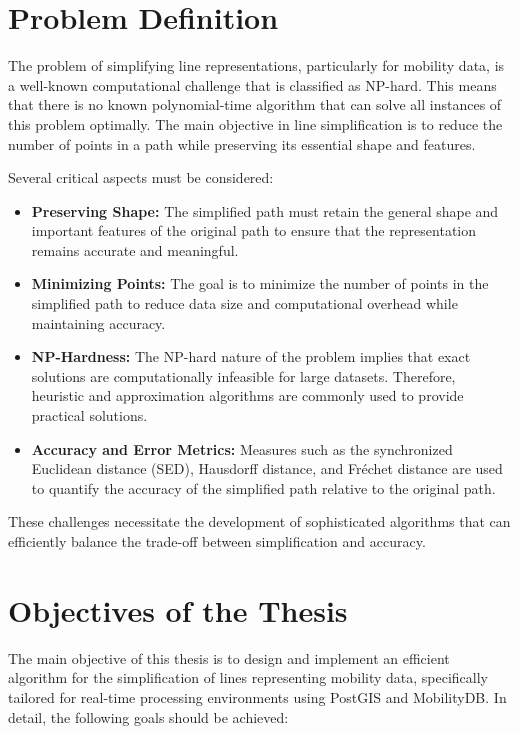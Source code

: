 \section{Problem Definition}

The problem of simplifying line representations, particularly for mobility data, is a well-known computational challenge that is classified as NP-hard. This means that there is no known polynomial-time algorithm that can solve all instances of this problem optimally. The main objective in line simplification is to reduce the number of points in a path while preserving its essential shape and features. 

Several critical aspects must be considered:

\begin{itemize}
    \item \textbf{Preserving Shape:} The simplified path must retain the general shape and important features of the original path to ensure that the representation remains accurate and meaningful.
    \item \textbf{Minimizing Points:} The goal is to minimize the number of points in the simplified path to reduce data size and computational overhead while maintaining accuracy.
    \item \textbf{NP-Hardness:} The NP-hard nature of the problem implies that exact solutions are computationally infeasible for large datasets. Therefore, heuristic and approximation algorithms are commonly used to provide practical solutions.
    \item \textbf{Accuracy and Error Metrics:} Measures such as the synchronized Euclidean distance (SED), Hausdorff distance, and Fréchet distance are used to quantify the accuracy of the simplified path relative to the original path.
\end{itemize}

These challenges necessitate the development of sophisticated algorithms that can efficiently balance the trade-off between simplification and accuracy.


\section{Objectives of the Thesis}

The main objective of this thesis is to design and implement an efficient algorithm for the simplification of lines representing mobility data, specifically tailored for real-time processing environments using PostGIS and MobilityDB. In detail, the following goals should be achieved:

